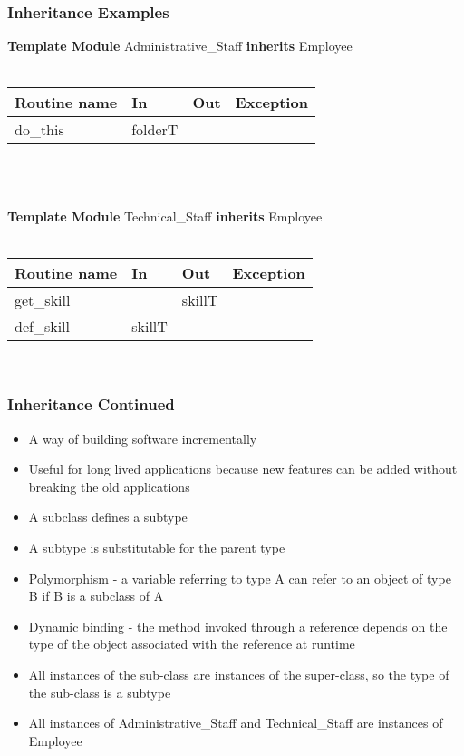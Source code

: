 \documentclass[t,12pt,numbers,fleqn,handout]{beamer}
\begin{document}
\begin{frame}
\frametitle{Inheritance Examples}

\textbf{Template Module}
Administrative\_Staff \textbf{inherits} Employee\\
~\newline

\begin{tabular}{| l | l | l | l |}
\hline
\textbf{Routine name} & \textbf{In} & \textbf{Out} & \textbf{Exception}\\
\hline
do\_this & folderT & ~ & ~\\
\hline
\end{tabular}\\
~\newline

\textbf{Template Module}
Technical\_Staff \textbf{inherits} Employee\\
~\newline

\begin{tabular}{| l | l | l | l |}
\hline
\textbf{Routine name} & \textbf{In} & \textbf{Out} & \textbf{Exception}\\
\hline
get\_skill & ~ & skillT & ~\\
\hline
def\_skill & skillT & ~ & ~\\
\hline
\end{tabular}\\

\end{frame}


\begin{frame}
\frametitle{Inheritance Continued}

\begin{itemize}
\item A way of building software incrementally
\item Useful for long lived applications because new features can be added without breaking the old applications
\item A subclass defines a subtype
\item A subtype is substitutable for the parent type
\item Polymorphism - a variable referring to type A can refer to an object of type B if B is a subclass of A
\item Dynamic binding - the method invoked through a reference depends on the type of the object associated with the
reference at runtime
\item All instances of the sub-class are instances of the super-class, so the type of the sub-class is a subtype
\item All instances of Administrative\_Staff and Technical\_Staff are instances of Employee
\end{itemize}
\end{frame}
\end{document}
